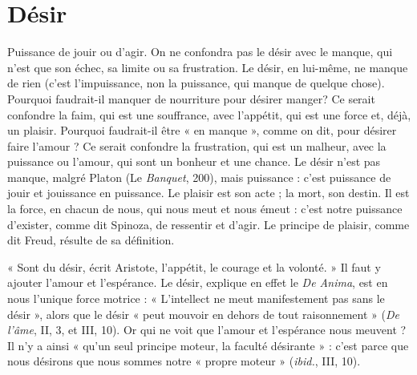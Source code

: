 \section{Désir}
Puissance de jouir ou d’agir.
On ne confondra pas le désir avec le manque, qui n’est que son
échec, sa limite ou sa frustration. Le désir, en lui-même, ne manque de rien
(c’est l’impuissance, non la puissance, qui manque de quelque chose). Pourquoi
faudrait-il manquer de nourriture pour désirer manger? Ce serait
confondre la faim, qui est une souffrance, avec l'appétit, qui est une force et,
déjà, un plaisir. Pourquoi faudrait-il être « en manque », comme on dit, pour
désirer faire l'amour ? Ce serait confondre la frustration, qui est un malheur,
avec la puissance ou l’amour, qui sont un bonheur et une chance. Le désir n’est
pas manque, malgré Platon (Le {\it Banquet}, 200), mais puissance : c’est puissance
de jouir et jouissance en puissance. Le plaisir est son acte ; la mort, son destin.
Il est la force, en chacun de nous, qui nous meut et nous émeut : c’est notre
puissance d'exister, comme dit Spinoza, de ressentir et d’agir. Le principe de
plaisir, comme dit Freud, résulte de sa définition.

« Sont du désir, écrit Aristote, l’appétit, le courage et la volonté. » Il faut y
ajouter l'amour et l’espérance. Le désir, explique en effet le {\it De Anima}, est en
nous l’unique force motrice : « L’intellect ne meut manifestement pas sans le
désir », alors que le désir « peut mouvoir en dehors de tout raisonnement » ({\it De
l'âme}, II, 3, et III, 10). Or qui ne voit que l’amour et l'espérance nous
meuvent ? Il n’y a ainsi « qu’un seul principe moteur, la faculté désirante » :
c’est parce que nous désirons que nous sommes notre « propre moteur » ({\it ibid.},
III, 10).

